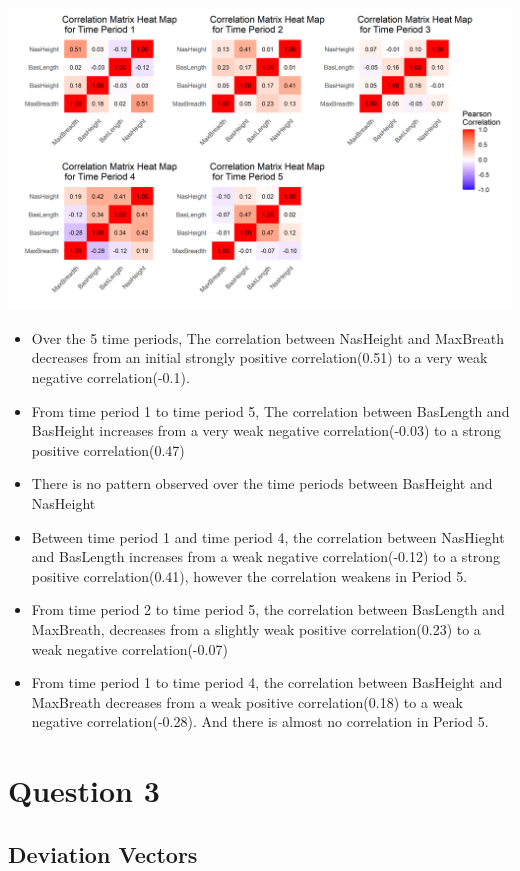 \documentclass[
]{article}
\begin{document}
\includegraphics[width=1\textwidth,height=\textheight]{correlation_heatmaps.png}
\newpage

\begin{itemize}
  \item Over the 5 time periods, The correlation between NasHeight and MaxBreath decreases from an initial strongly positive correlation(0.51) to a very weak negative correlation(-0.1).
  \item From time period 1 to time period 5, The correlation between BasLength and BasHeight increases from a very weak negative correlation(-0.03) to a strong positive correlation(0.47)
  \item There is no pattern observed over the time periods between BasHeight and NasHeight
  \item Between time period 1 and time period 4, the correlation between NasHieght and BasLength increases from a weak negative correlation(-0.12) to a strong positive correlation(0.41), however the correlation weakens in Period 5.
  \item From time period 2 to time period 5, the correlation between BasLength and MaxBreath, decreases from a slightly weak positive correlation(0.23) to a weak negative correlation(-0.07)
  \item From time period 1 to time period 4, the correlation between BasHeight and MaxBreath decreases from a weak positive correlation(0.18) to a weak negative correlation(-0.28). And there is almost no correlation in Period 5.
\end{itemize}

\section{Question 3}
\subsection{Deviation Vectors}
\end{document}
